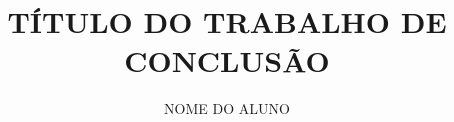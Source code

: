 \documentclass[versao=digital]{tc_ifto}
\author{NOME DO ALUNO}
\title{TÍTULO DO TRABALHO DE CONCLUSÃO}
\begin{document}
	
	
	\textual

	
	
	\postextual	
	

	\apendices
	
\end{document}
